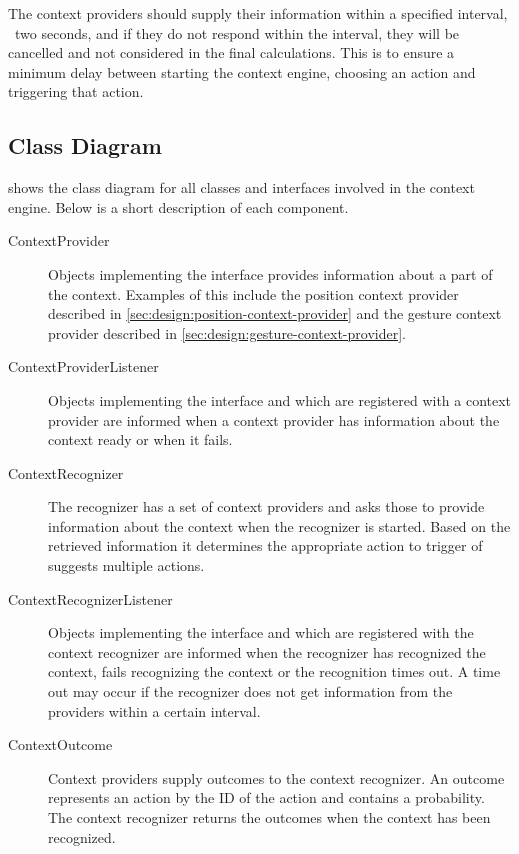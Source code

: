 The context providers should supply their information within a specified interval, \eg~two seconds, and if they do not respond within the interval, they will be cancelled and not considered in the final calculations. This is to ensure a minimum delay between starting the context engine, choosing an action and triggering that action.

\subsection{Class Diagram}
\label{sec:design:context-engine:class-diagram}

 shows the class diagram for all classes and interfaces involved in the context engine. Below is a short description of each component.

\begin{description}
\item[ContextProvider] Objects implementing the interface provides information about a part of the context. Examples of this include the position context provider described in \cref{sec:design:position-context-provider} and the gesture context provider described in \cref{sec:design:gesture-context-provider}.
\item[ContextProviderListener] Objects implementing the interface and which are registered with a context provider are informed when a context provider has information about the context ready or when it fails.
\item[ContextRecognizer] The recognizer has a set of context providers and asks those to provide information about the context when the recognizer is started. Based on the retrieved information it determines the appropriate action to trigger of suggests multiple actions.
\item[ContextRecognizerListener] Objects implementing the interface and which are registered with the context recognizer are informed when the recognizer has recognized the context, fails recognizing the context or the recognition times out. A time out may occur if the recognizer does not get information from the providers within a certain interval.
\item[ContextOutcome] Context providers supply outcomes to the context recognizer. An outcome represents an action by the ID of the action and contains a probability. The context recognizer returns the outcomes when the context has been recognized.
\end{description}

